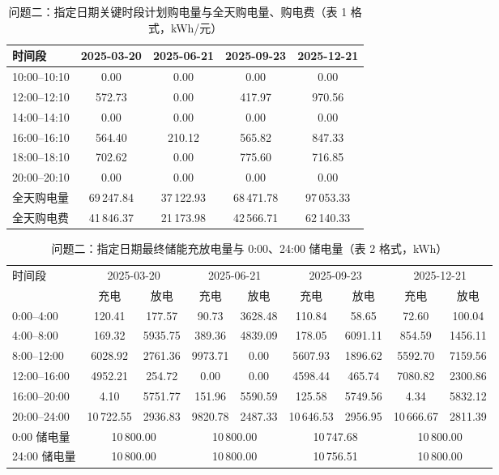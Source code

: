 \documentclass[12pt,a4paper,fontset=fandol]{ctexart}
\begin{document}
\begin{table}[htbp]
\centering
\caption{问题二\nobreak：指定日期关键时段计划购电量与全天购电量\nobreak、购电费（表 1 格式\nobreak，kWh/元\nobreak）}
\label{tab:q2t1}
\begin{tabular}{@{}lcccc@{}}
\toprule
时间段 & 2025-03-20 & 2025-06-21 & 2025-09-23 & 2025-12-21 \\
\midrule
10:00--10:10 & 0.00 & 0.00 & 0.00 & 0.00 \\
12:00--12:10 & 572.73 & 0.00 & 417.97 & 970.56 \\
14:00--14:10 & 0.00 & 0.00 & 0.00 & 0.00 \\
16:00--16:10 & 564.40 & 210.12 & 565.82 & 847.33 \\
18:00--18:10 & 702.62 & 0.00 & 775.60 & 716.85 \\
20:00--20:10 & 0.00 & 0.00 & 0.00 & 0.00 \\
\midrule
全天购电量 & 69\,247.84 & 37\,122.93 & 68\,471.78 & 97\,053.33 \\
全天购电费 & 41\,846.37 & 21\,173.98 & 42\,566.71 & 62\,140.33 \\
\bottomrule
\end{tabular}
\end{table}

\begin{table}[htbp]
\centering
\caption{问题二\nobreak：指定日期最终储能充放电量与 0:00\nobreak、24:00 储电量（表 2 格式\nobreak，kWh\nobreak）}
\label{tab:q2t2}
\begin{tabular}{@{}lcccccccc@{}}
\toprule
\multirow{2}{*}{时间段} & \multicolumn{2}{c}{2025-03-20} & \multicolumn{2}{c}{2025-06-21} &
\multicolumn{2}{c}{2025-09-23} & \multicolumn{2}{c}{2025-12-21} \\
\cmidrule(lr){2-3}\cmidrule(lr){4-5}\cmidrule(lr){6-7}\cmidrule(lr){8-9}
& 充电 & 放电 & 充电 & 放电 & 充电 & 放电 & 充电 & 放电 \\
\midrule
0:00--4:00 & 120.41 & 177.57 & 90.73 & 3628.48 & 110.84 & 58.65 & 72.60 & 100.04 \\
4:00--8:00 & 169.32 & 5935.75 & 389.36 & 4839.09 & 178.05 & 6091.11 & 854.59 & 1456.11 \\
8:00--12:00 & 6028.92 & 2761.36 & 9973.71 & 0.00 & 5607.93 & 1896.62 & 5592.70 & 7159.56 \\
12:00--16:00 & 4952.21 & 254.72 & 0.00 & 0.00 & 4598.44 & 465.74 & 7080.82 & 2300.86 \\
16:00--20:00 & 4.10 & 5751.77 & 151.96 & 5590.59 & 125.58 & 5749.56 & 4.34 & 5832.12 \\
20:00--24:00 & 10\,722.55 & 2936.83 & 9820.78 & 2487.33 & 10\,646.53 & 2956.95 & 10\,666.67 & 2811.39 \\
\midrule
0:00 储电量 & \multicolumn{2}{c}{10\,800.00} & \multicolumn{2}{c}{10\,800.00} &
\multicolumn{2}{c}{10\,747.68} & \multicolumn{2}{c}{10\,800.00} \\
24:00 储电量 & \multicolumn{2}{c}{10\,800.00} & \multicolumn{2}{c}{10\,800.00} &
\multicolumn{2}{c}{10\,756.51} & \multicolumn{2}{c}{10\,800.00} \\
\bottomrule
\end{tabular}
\end{table}
\end{document}
